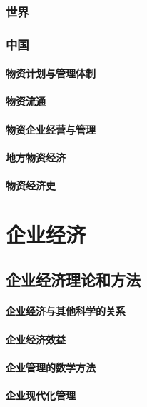 \documentclass[UTF8]{../../RepresentationUniverse}
\begin{document}
    \subsection{世界}
    \subsection{中国}
        \subsubsection{物资计划与管理体制}
        \subsubsection{物资流通}
        \subsubsection{物资企业经营与管理}
        \subsubsection{地方物资经济}
        \subsubsection{物资经济史}






\chapter{企业经济}
\section{企业经济理论和方法}
    \subsubsection{企业经济与其他科学的关系}
    \subsubsection{企业经济效益}
    \subsubsection{企业管理的数学方法}
    \subsubsection{企业现代化管理}
\end{document}
